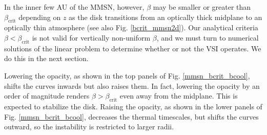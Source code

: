 In the inner few AU of the MMSN, however, $\beta$ 
may be smaller or greater than $\beta_\mathrm{crit}$ depending on
$z$ as the disk transitions from an optically thick midplane to an
optically thin atmosphere (see also Fig. \ref{bcrit_mmsn2d}). 
Our analytical criteria $\beta < \beta_\mathrm{crit}$ is not valid for
vertically non-uniform $\beta$, and we must turn to numerical
solutions of the linear problem to determine whether or not the VSI
operates. We do this in the next section.    
 
Lowering the opacity, as shown in the top panels of
Fig. \ref{mmsn_bcrit_bcool}, shifts the curves inwards but also raises
them. In fact, lowering the opacity by an order of magnitude renders  
$\beta > \beta_\mathrm{crit}$ even away from the midplane. This is 
expected to stabilize the disk. Raising the opacity, as shown in 
the lower panels of Fig. \ref{mmsn_bcrit_bcool}, decreases the thermal
timescales, but shifts the curves outward, so the instability is
restricted to larger radii.  

